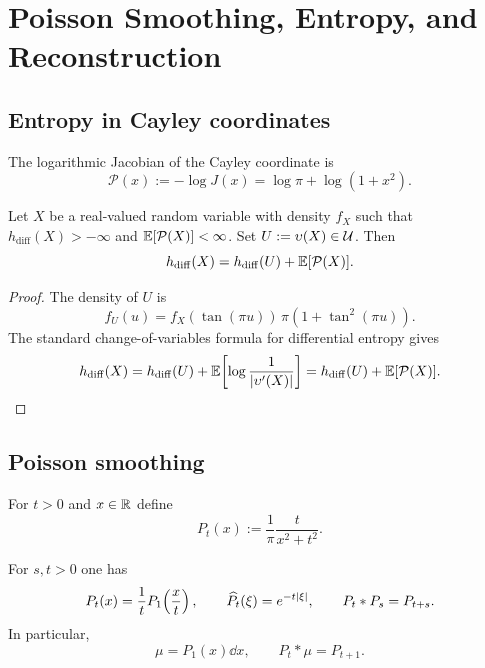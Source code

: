 \section{Poisson Smoothing, Entropy, and Reconstruction}%
\label{sec:precision-potential}

\subsection{Entropy in Cayley coordinates}

The logarithmic Jacobian of the Cayley coordinate is
\begin{equation}\label{eq:precision-potential}
\mathcal P(x):=-\log J(x)=\log\pi+\log(1+x^{2}).
\end{equation}

\begin{theorem}%
\label{thm:precision-ledger}
Let $X$ be a real-valued random variable with density $f_X$ such that
$h_{\mathrm{diff}}(X)>-\infty$ and $\mathbb{E}[\mathcal P(X)]<\infty$.  Set
$U:=\upsilon(X)\in\mathcal{U}$.  Then
\begin{equation}\label{eq:entropy-ledger}
h_{\mathrm{diff}}(X)
=h_{\mathrm{diff}}(U)+\mathbb{E}[\mathcal P(X)].
\end{equation}
\end{theorem}

\begin{proof}
The density of $U$ is
\[
f_U(u)=f_X(\tan(\pi u))\,\pi(1+\tan^2(\pi u)).
\]
The standard change-of-variables formula for differential entropy gives
\[
h_{\mathrm{diff}}(X)
=h_{\mathrm{diff}}(U)+\mathbb{E}\!\left[\log\frac{1}{\lvert \upsilon'(X)\rvert}\right]
=h_{\mathrm{diff}}(U)+\mathbb{E}[\mathcal P(X)].
\]
\end{proof}

\subsection{Poisson smoothing}

For $t>0$ and $x\in\mathbb{R}$ define
\begin{equation}\label{eq:poisson-kernel}
P_t(x):=\frac{1}{\pi}\frac{t}{x^{2}+t^{2}}.
\end{equation}

\begin{proposition}%
\label{prop:poisson-identities}
For $s,t>0$ one has
\begin{equation}\label{eq:poisson-basic}
P_t(x)=\frac{1}{t}P_1\!\left(\frac{x}{t}\right),
\qquad
\widehat{P_t}(\xi)=e^{-t\lvert \xi\rvert},
\qquad
P_t*P_s=P_{t+s}.
\end{equation}
In particular,
\[
\mu=P_1(x)\dd x,
\qquad
P_t*\mu=P_{t+1}.
\]
\end{proposition}

